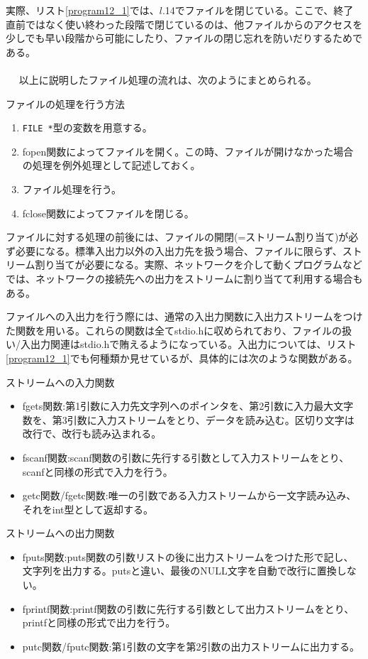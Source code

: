 実際、リスト\ref{program12_1}では、$l$.14でファイルを閉じている。ここで、終了直前ではなく使い終わった段階で閉じているのは、他ファイルからのアクセスを少しでも早い段階から可能にしたり、ファイルの閉じ忘れを防いだりするためである。
\\ \\　
以上に説明したファイル処理の流れは、次のようにまとめられる。
\begin{itembox}[l]{ファイルの処理を行う方法}
\begin{enumerate}
\item \verb|FILE *|型の変数を用意する。
\item fopen関数によってファイルを開く。この時、ファイルが開けなかった場合の処理を例外処理として記述しておく。
\item ファイル処理を行う。
\item fclose関数によってファイルを閉じる。
\end{enumerate}
\end{itembox}

ファイルに対する処理の前後には、ファイルの開閉(=ストリーム割り当て)が必ず必要になる。標準入出力以外の入出力先を扱う場合、ファイルに限らず、ストリーム割り当てが必要になる。実際、ネットワークを介して動くプログラムなどでは、ネットワークの接続先への出力をストリームに割り当てて利用する場合もある。

ファイルへの入出力を行う際には、通常の入出力関数に入出力ストリームをつけた関数を用いる。これらの関数は全てstdio.hに収められており、ファイルの扱い/入出力関連はstdio.hで賄えるようになっている。入出力については、リスト\ref{program12_1}でも何種類か見せているが、具体的には次のような関数がある。
\begin{itembox}[l]{ストリームへの入力関数}
\begin{itemize}
\item fgets関数:第1引数に入力先文字列へのポインタを、第2引数に入力最大文字数を、第3引数に入力ストリームをとり、データを読み込む。区切り文字は改行で、改行も読み込まれる。
\item fscanf関数:scanf関数の引数に先行する引数として入力ストリームをとり、scanfと同様の形式で入力を行う。
\item getc関数/fgetc関数:唯一の引数である入力ストリームから一文字読み込み、それをint型として返却する。
\end{itemize}
\end{itembox}

\begin{itembox}[l]{ストリームへの出力関数}
\begin{itemize}
\item fputs関数:puts関数の引数リストの後に出力ストリームをつけた形で記し、文字列を出力する。putsと違い、最後のNULL文字を自動で改行に置換しない。
\item fprintf関数:printf関数の引数に先行する引数として出力ストリームをとり、printfと同様の形式で出力を行う。
\item putc関数/fputc関数:第1引数の文字を第2引数の出力ストリームに出力する。
\end{itemize}
\end{itembox}

